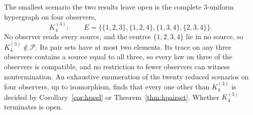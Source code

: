The smallest scenario the two results leave open is the complete $3$-uniform hypergraph on four observers,
\[
K_4^{(3)}:\qquad E=\bigl\{\{1,2,3\},\{1,2,4\},\{1,3,4\},\{2,3,4\}\bigr\}.
\]
No observer reads every source, and the centres $\{1,2,3,4\}$ lie in no source, so $K_4^{(3)}\notin\mathcal P$. Its pair sets have at most two elements. Its trace on any three observers contains a source equal to all three, so every law on three of the observers is compatible, and no restriction to fewer observers can witness nontermination. An exhaustive enumeration of the twenty reduced scenarios on four observers, up to isomorphism, finds that every one other than $K_4^{(3)}$ is decided by Corollary~\ref{cor:hpeel} or Theorem~\ref{thm:hpairset}. Whether $K_4^{(3)}$ terminates is open.
